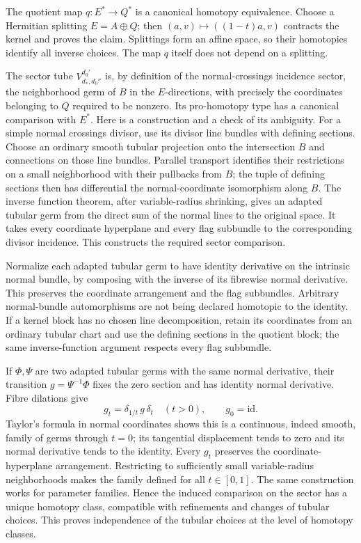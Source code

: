 \documentclass[11pt,a4paper]{article}
\theoremstyle{definition}
\begin{document}
The quotient map \(q:E^*\to Q^*\) is a canonical homotopy equivalence. Choose a Hermitian splitting \(E=A\oplus Q\); then \((a,v)\mapsto((1-t)a,v)\) contracts the kernel and proves the claim. Splittings form an affine space, so their homotopies identify all inverse choices. The map \(q\) itself does not depend on a splitting.

The sector tube \(V^{d_0'}_{d_*,d_0''}\) is, by definition of the normal-crossings incidence sector, the neighborhood germ of \(B\) in the \(E\)-directions, with precisely the coordinates belonging to \(Q\) required to be nonzero. Its pro-homotopy type has a canonical comparison with \(E^*\). Here is a construction and a check of its ambiguity. For a simple normal crossings divisor, use its divisor line bundles with defining sections. Choose an ordinary smooth tubular projection onto the intersection \(B\) and connections on those line bundles. Parallel transport identifies their restrictions on a small neighborhood with their pullbacks from \(B\); the tuple of defining sections then has differential the normal-coordinate isomorphism along \(B\). The inverse function theorem, after variable-radius shrinking, gives an adapted tubular germ from the direct sum of the normal lines to the original space. It takes every coordinate hyperplane and every flag subbundle to the corresponding divisor incidence. This constructs the required sector comparison.

Normalize each adapted tubular germ to have identity derivative on the intrinsic normal bundle, by composing with the inverse of its fibrewise normal derivative. This preserves the coordinate arrangement and the flag subbundles. Arbitrary normal-bundle automorphisms are not being declared homotopic to the identity. If a kernel block has no chosen line decomposition, retain its coordinates from an ordinary tubular chart and use the defining sections in the quotient block; the same inverse-function argument respects every flag subbundle.

If \(\Phi,\Psi\) are two adapted tubular germs with the same normal derivative, their transition \(g=\Psi^{-1}\Phi\) fixes the zero section and has identity normal derivative. Fibre dilations give \[
 g_t=\delta_{1/t}\,g\,\delta_t\quad(t>0),\qquad g_0=\mathrm{id}.
\] Taylor's formula in normal coordinates shows this is a continuous, indeed smooth, family of germs through \(t=0\); its tangential displacement tends to zero and its normal derivative tends to the identity. Every \(g_t\) preserves the coordinate-hyperplane arrangement. Restricting to sufficiently small variable-radius neighborhoods makes the family defined for all \(t\in[0,1]\). The same construction works for parameter families. Hence the induced comparison on the sector has a unique homotopy class, compatible with refinements and changes of tubular choices. This proves independence of the tubular choices at the level of homotopy classes.
\end{document}
